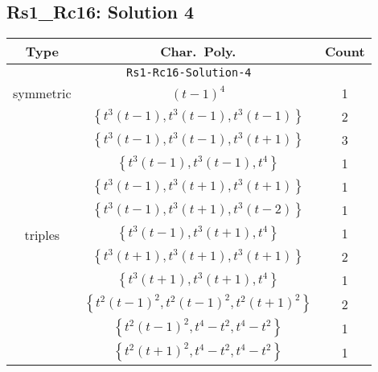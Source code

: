 \documentclass{article}
\begin{document}
        \subsection{Rs1\_Rc16: Solution 4}
        \begin{tabular}{|c|c|c|}
        \hline
        \textbf{Type} & \textbf{Char.~Poly.} & \textbf{Count} \\
        \hline \multicolumn{3}{|c|}{\texttt{Rs1-Rc16-Solution-4}} \\ \hline
        \multirow{1}{*}{symmetric}
        & $(t - 1)^4$ & 1 \\
        \hline
        \multirow{11}{*}{triples}
         & $\left\{t^3(t - 1),t^3(t - 1),t^3(t - 1)\right\}$ & 2 \\
         & $\left\{t^3(t - 1),t^3(t - 1),t^3(t + 1)\right\}$ & 3 \\
         & $\left\{t^3(t - 1),t^3(t - 1),t^4\right\}$ & 1 \\
         & $\left\{t^3(t - 1),t^3(t + 1),t^3(t + 1)\right\}$ & 1 \\
         & $\left\{t^3(t - 1),t^3(t + 1),t^3(t - 2)\right\}$ & 1 \\
         & $\left\{t^3(t - 1),t^3(t + 1),t^4\right\}$ & 1 \\
         & $\left\{t^3(t + 1),t^3(t + 1),t^3(t + 1)\right\}$ & 2 \\
         & $\left\{t^3(t + 1),t^3(t + 1),t^4\right\}$ & 1 \\
         & $\left\{t^2(t - 1)^2,t^2(t - 1)^2,t^2(t + 1)^2\right\}$ & 2 \\
         & $\left\{t^2(t - 1)^2,t^4 - t^2,t^4 - t^2\right\}$ & 1 \\
         & $\left\{t^2(t + 1)^2,t^4 - t^2,t^4 - t^2\right\}$ & 1 \\
        \hline
        \end{tabular}
        
        \newpage
        
\end{document}
